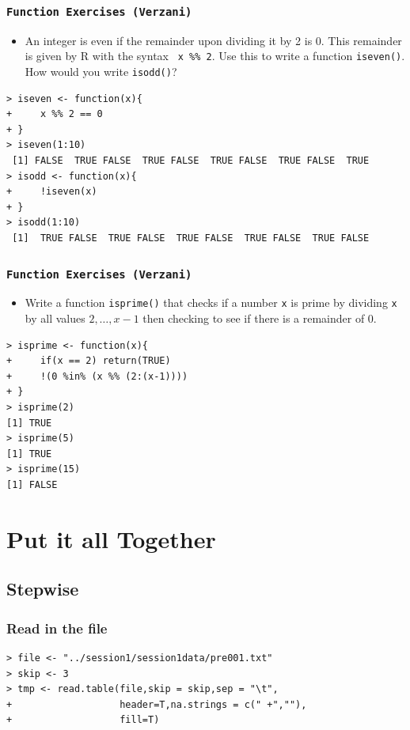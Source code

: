 \documentclass[xcolor={table},c]{beamer}
\begin{document}
\begin{frame}[fragile]\frametitle{\texttt{Function Exercises (Verzani)}}
  \begin{itemize}
  \item An integer is even if the remainder upon dividing it by 2 is 0. This remainder is given by R with the syntax \texttt{ x \%\% 2}. Use this to write a function \texttt{iseven()}. How would you write \texttt{isodd()}?
  \end{itemize}
\begin{verbatim}
> iseven <- function(x){
+     x %% 2 == 0
+ }
> iseven(1:10)
 [1] FALSE  TRUE FALSE  TRUE FALSE  TRUE FALSE  TRUE FALSE  TRUE
> isodd <- function(x){
+     !iseven(x)
+ }
> isodd(1:10)
 [1]  TRUE FALSE  TRUE FALSE  TRUE FALSE  TRUE FALSE  TRUE FALSE
\end{verbatim}
\end{frame}

\begin{frame}[fragile]\frametitle{\texttt{Function Exercises (Verzani)}}
  \begin{itemize}
  \item Write a function \texttt{isprime()} that checks if a number \texttt{x} is prime by dividing \texttt{x} by all values \texttt{$2,\ldots,x-1$} then checking to see if there is a remainder of 0. 
  \end{itemize}
\begin{verbatim}
> isprime <- function(x){
+     if(x == 2) return(TRUE)
+     !(0 %in% (x %% (2:(x-1))))
+ }
> isprime(2)
[1] TRUE
> isprime(5)
[1] TRUE
> isprime(15)
[1] FALSE  
\end{verbatim}
\end{frame}


\section{Put it all Together}

\subsection{Stepwise}
\begin{frame}[fragile]\frametitle{Read in the file}
\begin{verbatim}
> file <- "../session1/session1data/pre001.txt"
> skip <- 3
> tmp <- read.table(file,skip = skip,sep = "\t",
+                   header=T,na.strings = c(" +",""),
+                   fill=T)
\end{verbatim}
\end{frame}
\end{document}

